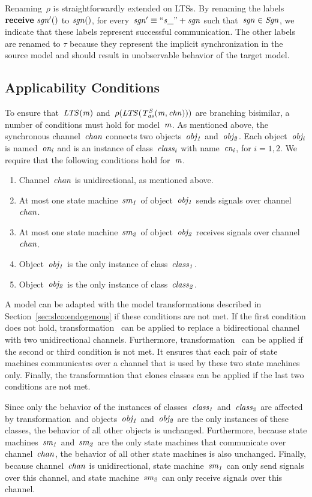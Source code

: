 \noindent
Renaming~$\rho$ is straightforwardly extended on LTSs.
By renaming the labels~$\textbf{receive}~\it{sgn'()}$ to $\it{sgn()}$, for every~$\it{sgn'} \equiv ``s\_" + \it{sgn}$ such that~$\it{sgn}\in \it{Sgn}$, we indicate that these labels represent successful communication.
The other labels are renamed to $\tau$ because they represent the implicit synchronization in the source model and should result in unobservable behavior of the target model.

\subsection{Applicability Conditions}
To ensure that~$\it{LTS}(m)$ and~$\rho(\it{LTS}(T^S_{\it{as}}(m, \it{chn})))$ are branching bisimilar, a number of conditions must hold for model~$\it{m}$.
As mentioned above, the synchronous channel~$\it{chan}$ connects two objects~$\it{obj_1}$ and~$\it{obj_2}$.
Each object~$\it{obj_i}$ is named~$\it{on_i}$ and is an instance of class~$\it{class_i}$ with name~$\it{cn_i}$, for $i = 1,2$.
We require that the following conditions hold for~$\it{m}$.
\begin{enumerate}
\item Channel~$\it{chan}$ is unidirectional, as mentioned above.
\item At most one state machine~$\it{sm_1}$ of object~$\it{obj_1}$ sends signals over channel~$\it{chan}$.
\item At most one state machine~$\it{sm_2}$ of object~$\it{obj_2}$ receives signals over channel~$\it{chan}$.
\item Object~$\it{obj_1}$ is the only instance of class~$\it{class_1}$.
\item Object~$\it{obj_2}$ is the only instance of class~$\it{class_2}$.
\end{enumerate}
A model can be adapted with the model transformations described in Section~\ref{sec:slco:endogenous} if these conditions are not met.
If the first condition does not hold, transformation~ can be applied to replace a bidirectional channel with two unidirectional channels.
Furthermore, transformation~ can be applied if the second or third condition is not met.
It ensures that each pair of state machines communicates over a channel that is used by these two state machines only.
Finally, the transformation that clones classes can be applied if the last two conditions are not met.

Since only the behavior of the instances of classes~$\it{class_1}$ and~$\it{class_2}$ are affected by transformation~\TSim and objects~$\it{obj_1}$ and~$\it{obj_2}$ are the only instances of these classes, the behavior of all other objects is unchanged.
Furthermore, because state machines~$\it{sm_1}$ and~$\it{sm_2}$ are the only state machines that communicate over channel~$\it{chan}$, the behavior of all other state machines is also unchanged.
Finally, because channel~$\it{chan}$ is unidirectional, state machine~$\it{sm_1}$ can only send signals over this channel, and state machine~$\it{sm_2}$ can only receive signals over this channel.

